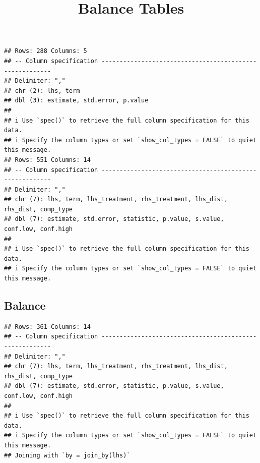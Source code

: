 \documentclass[
]{article}
\title{Balance Tables}
\author{}
\date{\vspace{-2.5em}}
\begin{document}
\maketitle

\begin{verbatim}
## Rows: 288 Columns: 5
## -- Column specification --------------------------------------------------------
## Delimiter: ","
## chr (2): lhs, term
## dbl (3): estimate, std.error, p.value
## 
## i Use `spec()` to retrieve the full column specification for this data.
## i Specify the column types or set `show_col_types = FALSE` to quiet this message.
## Rows: 551 Columns: 14
## -- Column specification --------------------------------------------------------
## Delimiter: ","
## chr (7): lhs, term, lhs_treatment, rhs_treatment, lhs_dist, rhs_dist, comp_type
## dbl (7): estimate, std.error, statistic, p.value, s.value, conf.low, conf.high
## 
## i Use `spec()` to retrieve the full column specification for this data.
## i Specify the column types or set `show_col_types = FALSE` to quiet this message.
\end{verbatim}

\subsection{Balance}\label{balance}

\begin{verbatim}
## Rows: 361 Columns: 14
## -- Column specification --------------------------------------------------------
## Delimiter: ","
## chr (7): lhs, term, lhs_treatment, rhs_treatment, lhs_dist, rhs_dist, comp_type
## dbl (7): estimate, std.error, statistic, p.value, s.value, conf.low, conf.high
## 
## i Use `spec()` to retrieve the full column specification for this data.
## i Specify the column types or set `show_col_types = FALSE` to quiet this message.
## Joining with `by = join_by(lhs)`
\end{verbatim}
\end{document}
